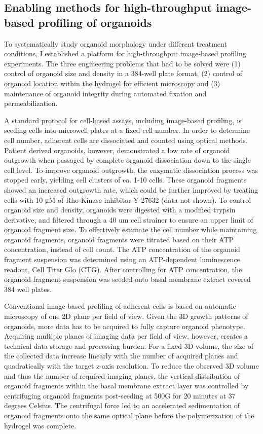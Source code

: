 \begin{flushleft}
\section{Enabling methods for high-throughput image-based profiling of organoids}
To systematically study organoid morphology under different treatment conditions, I established a platform for high-throughput image-based profiling experiments. The three engineering problems that had to be solved were (1) control of organoid size and density in a 384-well plate format, (2) control of organoid location within the hydrogel for efficient microscopy and (3) maintenance of organoid integrity during automated fixation and permeabilization. 


A standard protocol for cell-based assays, including image-based profiling, is seeding cells into microwell plates at a fixed cell number. In order to determine cell number, adherent cells are dissociated and counted using optical methods. Patient derived organoids, however, demonstrated a low rate of organoid outgrowth when passaged by complete organoid dissociation down to the single cell level. To improve organoid outgrowth, the enzymatic dissociation process was stopped early, yielding cell clusters of ca. 1-10 cells. These organoid fragments showed an increased outgrowth rate, which could be further improved by treating cells with 10 μM of Rho-Kinase inhibitor Y-27632 (data not shown). To control organoid size and density, organoids were digested with a modified trypsin derivative, and filtered through a 40 um cell strainer to ensure an upper limit of organoid fragment size. To effectively estimate the cell number while maintaining organoid fragments, organoid fragments were titrated based on their ATP concentration, instead of cell count. The ATP concentration of the organoid fragment suspension was determined using an ATP-dependent luminescence readout, Cell Titer Glo (CTG). After controlling for ATP concentration, the organoid fragment suspension was seeded onto basal membrane extract covered 384 well plates.
\bigbreak

Conventional image-based profiling of adherent cells is based on automatic microscopy of one 2D plane per field of view. Given the 3D growth patterns of organoids, more data has to be acquired to fully capture organoid phenotype. Acquiring multiple planes of imaging data per field of view, however, creates a technical data storage and processing burden. For a fixed 3D volume, the size of the collected data increase linearly with the number of acquired planes and quadratically with the target z-axis resolution. To reduce the observed 3D volume and thus the number of required imaging planes, the vertical distribution of organoid fragments within the basal membrane extract layer was controlled by centrifuging organoid fragments post-seeding at 500G for 20 minutes at 37 degrees Celsius. The centrifugal force led to an accelerated sedimentation of organoid fragments onto the same optical plane before the polymerization of the hydrogel was complete.
\bigbreak


\end{flushleft}
